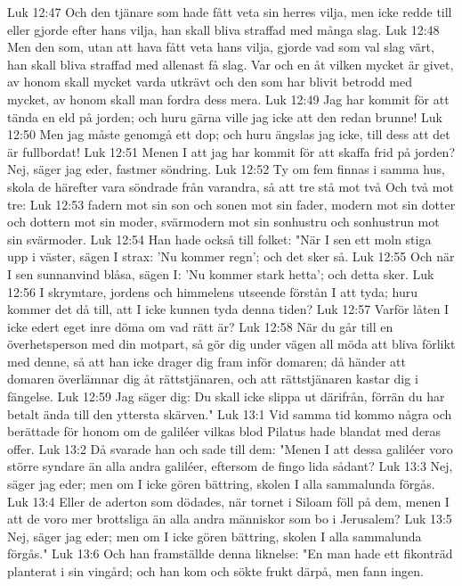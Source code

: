 Luk 12:47  Och den tjänare som hade fått veta sin herres vilja, men icke redde till eller gjorde efter hans vilja, han skall bliva straffad med många slag.
Luk 12:48  Men den som, utan att hava fått veta hans vilja, gjorde vad som val slag värt, han skall bliva straffad med allenast få slag. Var och en åt vilken mycket är givet, av honom skall mycket varda utkrävt och den som har blivit betrodd med mycket, av honom skall man fordra dess mera.
Luk 12:49  Jag har kommit för att tända en eld på jorden; och huru gärna ville jag icke att den redan brunne!
Luk 12:50  Men jag måste genomgå ett dop; och huru ängslas jag icke, till dess att det är fullbordat!
Luk 12:51  Menen I att jag har kommit för att skaffa frid på jorden? Nej, säger jag eder, fastmer söndring.
Luk 12:52  Ty om fem finnas i samma hus, skola de härefter vara söndrade från varandra, så att tre stå mot två Och två mot tre:
Luk 12:53  fadern mot sin son och sonen mot sin fader, modern mot sin dotter och dottern mot sin moder, svärmodern mot sin sonhustru och sonhustrun mot sin svärmoder.
Luk 12:54  Han hade också till folket: "När I sen ett moln stiga upp i väster, sägen I strax: 'Nu kommer regn'; och det sker så.
Luk 12:55  Och när I sen sunnanvind blåsa, sägen I: 'Nu kommer stark hetta'; och detta sker.
Luk 12:56  I skrymtare, jordens och himmelens utseende förstån I att tyda; huru kommer det då till, att I icke kunnen tyda denna tiden?
Luk 12:57  Varför låten I icke edert eget inre döma om vad rätt är?
Luk 12:58  När du går till en överhetsperson med din motpart, så gör dig under vägen all möda att bliva förlikt med denne, så att han icke drager dig fram inför domaren; då händer att domaren överlämnar dig åt rättstjänaren, och att rättstjänaren kastar dig i fängelse.
Luk 12:59  Jag säger dig: Du skall icke slippa ut därifrån, förrän du har betalt ända till den yttersta skärven."
Luk 13:1  Vid samma tid kommo några och berättade för honom om de galiléer vilkas blod Pilatus hade blandat med deras offer.
Luk 13:2  Då svarade han och sade till dem: "Menen I att dessa galiléer voro större syndare än alla andra galiléer, eftersom de fingo lida sådant?
Luk 13:3  Nej, säger jag eder; men om I icke gören bättring, skolen I alla sammalunda förgås.
Luk 13:4  Eller de aderton som dödades, när tornet i Siloam föll på dem, menen I att de voro mer brottsliga än alla andra människor som bo i Jerusalem?
Luk 13:5  Nej, säger jag eder; men om I icke gören bättring, skolen I alla sammalunda förgås."
Luk 13:6  Och han framställde denna liknelse: "En man hade ett fikonträd planterat i sin vingård; och han kom och sökte frukt därpå, men fann ingen.
